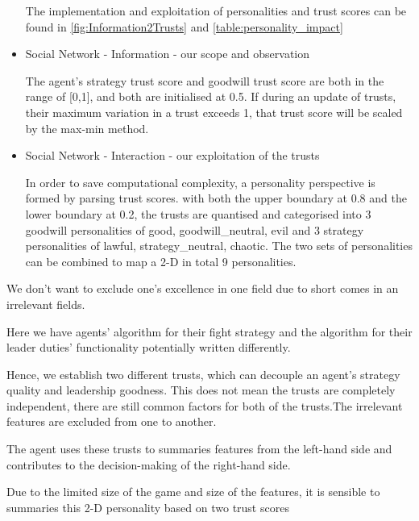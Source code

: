 \begin{itemize}
          The implementation and exploitation of personalities and trust scores can be found in \ref{fig:Information2Trusts} and \ref{table:personality_impact}

    \item Social Network - Information - our scope and observation

          The agent's strategy trust score and goodwill trust score are both in the range of [0,1], and both are initialised at 0.5. If during an update of trusts, their maximum variation in a trust exceeds 1, that trust score will be scaled by the max-min method.
    \item Social Network - Interaction - our exploitation of the trusts

          In order to save computational complexity, a personality perspective is formed by parsing trust scores. with both the upper boundary at 0.8 and the lower boundary at 0.2, the trusts are quantised and categorised into 3 goodwill personalities of {good, goodwill\_neutral, evil} and 3 strategy personalities of {lawful, strategy\_neutral, chaotic}. The two sets of personalities can be combined to map a 2-D in total 9 personalities.

\end{itemize}

We don't want to exclude one's excellence in one field due to short comes in an irrelevant fields.

Here we have agents' algorithm for their fight strategy and the algorithm for their leader duties' functionality potentially written differently.

Hence, we establish two different trusts, which can decouple an agent's strategy quality and leadership goodness. This does not mean the trusts are completely independent, there are still common factors for both of the trusts.The irrelevant features are excluded from one to another.

The agent uses these trusts to summaries features from the left-hand side and contributes to the decision-making of the right-hand side.

Due to the limited size of the game and size of the features, it is sensible to summaries this 2-D personality based on two trust scores

